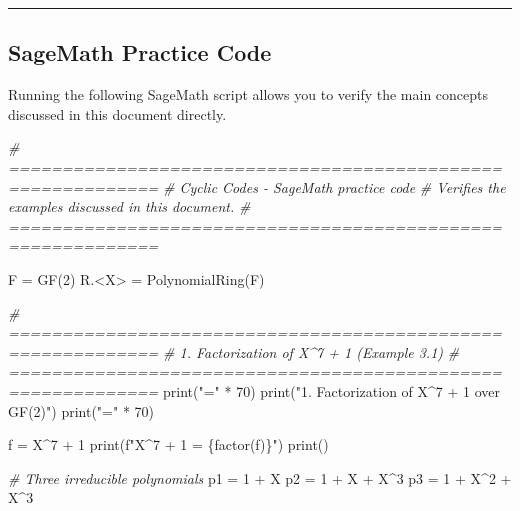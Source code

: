 \documentclass[
]{article}
\newenvironment{Shaded}{}{}
\newcommand{\BuiltInTok}[1]{\textcolor[rgb]{0.00,0.50,0.00}{#1}}
\newcommand{\CommentTok}[1]{\textcolor[rgb]{0.38,0.63,0.69}{\textit{#1}}}
\newcommand{\DecValTok}[1]{\textcolor[rgb]{0.25,0.63,0.44}{#1}}
\newcommand{\NormalTok}[1]{#1}
\newcommand{\OperatorTok}[1]{\textcolor[rgb]{0.40,0.40,0.40}{#1}}
\newcommand{\SpecialCharTok}[1]{\textcolor[rgb]{0.25,0.44,0.63}{#1}}
\newcommand{\SpecialStringTok}[1]{\textcolor[rgb]{0.73,0.40,0.53}{#1}}
\newcommand{\StringTok}[1]{\textcolor[rgb]{0.25,0.44,0.63}{#1}}
\begin{document}
\begin{center}\rule{0.5\linewidth}{0.5pt}\end{center}

\subsection{SageMath Practice Code}\label{sagemath-practice-code}

Running the following SageMath script allows you to verify the main
concepts discussed in this document directly.

\begin{Shaded}
\begin{Highlighting}[]
\CommentTok{\# ============================================================}
\CommentTok{\# Cyclic Codes {-} SageMath practice code}
\CommentTok{\# Verifies the examples discussed in this document.}
\CommentTok{\# ============================================================}

\NormalTok{F }\OperatorTok{=}\NormalTok{ GF(}\DecValTok{2}\NormalTok{)}
\NormalTok{R.}\OperatorTok{\textless{}}\NormalTok{X}\OperatorTok{\textgreater{}} \OperatorTok{=}\NormalTok{ PolynomialRing(F)}

\CommentTok{\# ============================================================}
\CommentTok{\# 1. Factorization of X\^{}7 + 1 (Example 3.1)}
\CommentTok{\# ============================================================}
\BuiltInTok{print}\NormalTok{(}\StringTok{"="} \OperatorTok{*} \DecValTok{70}\NormalTok{)}
\BuiltInTok{print}\NormalTok{(}\StringTok{"1. Factorization of X\^{}7 + 1 over GF(2)"}\NormalTok{)}
\BuiltInTok{print}\NormalTok{(}\StringTok{"="} \OperatorTok{*} \DecValTok{70}\NormalTok{)}

\NormalTok{f }\OperatorTok{=}\NormalTok{ X}\OperatorTok{\^{}}\DecValTok{7} \OperatorTok{+} \DecValTok{1}
\BuiltInTok{print}\NormalTok{(}\SpecialStringTok{f"X\^{}7 + 1 = }\SpecialCharTok{\{}\NormalTok{factor(f)}\SpecialCharTok{\}}\SpecialStringTok{"}\NormalTok{)}
\BuiltInTok{print}\NormalTok{()}

\CommentTok{\# Three irreducible polynomials}
\NormalTok{p1 }\OperatorTok{=} \DecValTok{1} \OperatorTok{+}\NormalTok{ X}
\NormalTok{p2 }\OperatorTok{=} \DecValTok{1} \OperatorTok{+}\NormalTok{ X }\OperatorTok{+}\NormalTok{ X}\OperatorTok{\^{}}\DecValTok{3}
\NormalTok{p3 }\OperatorTok{=} \DecValTok{1} \OperatorTok{+}\NormalTok{ X}\OperatorTok{\^{}}\DecValTok{2} \OperatorTok{+}\NormalTok{ X}\OperatorTok{\^{}}\DecValTok{3}


\end{Highlighting}
\end{Shaded}
\end{document}

